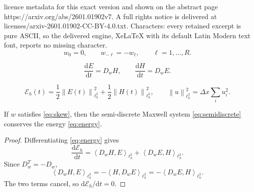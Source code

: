 \documentclass[10pt,a4paper]{amsart}
\newcommand{\Eh}{\mathcal E_h}
\newcommand{\dd}{\mathrm{d}}
\newcommand{\dx}{\Delta x}
\newcommand{\inner}[2]{\left\langle #1,#2\right\rangle}
\newcommand{\norm}[2]{\left\|#1\right\|_{#2}}
\begin{document}
licence metadata for this exact version and shown on the abstract page https://arxiv.org/abs/2601.01902v7. A full rights notice is delivered at licenses/arxiv-2601.01902-CC-BY-4.0.txt. Characters: every retained excerpt is pure ASCII, so the delivered engine, XeLaTeX with its default Latin Modern text font, reports no missing character.
\begin{equation}
  w_0=0,\qquad w_{-\ell}=-w_\ell,\qquad \ell=1,\ldots,R.
  \label{eq:skew}
\end{equation}

\begin{equation}
  \frac{\dd E}{\dd t}=D_wH,
  \qquad
  \frac{\dd H}{\dd t}=D_wE.
  \label{eq:semidiscrete}
\end{equation}

\begin{equation}
  \Eh(t)=
  \frac12\norm{E(t)}{\ell^2_h}^2
  +
  \frac12\norm{H(t)}{\ell^2_h}^2,
  \qquad
  \norm{u}{\ell^2_h}^2=\dx\sum_i u_i^2.
  \label{eq:energy}
\end{equation}

\begin{proposition}
If $w$ satisfies \eqref{eq:skew}, then the semi-discrete Maxwell system
\eqref{eq:semidiscrete} conserves the energy \eqref{eq:energy}.
\end{proposition}

\begin{proof}
Differentiating \eqref{eq:energy} gives
\[
  \frac{\dd \Eh}{\dd t}
  =
  \inner{D_wH}{E}_{\ell^2_h}
  +
  \inner{D_wE}{H}_{\ell^2_h}.
\]
Since $D_w^T=-D_w$,
\[
  \inner{D_wH}{E}_{\ell^2_h}
  =
  -\inner{H}{D_wE}_{\ell^2_h}
  =
  -\inner{D_wE}{H}_{\ell^2_h}.
\]
The two terms cancel, so $\dd\Eh/\dd t=0$.
\end{proof}
\end{document}
